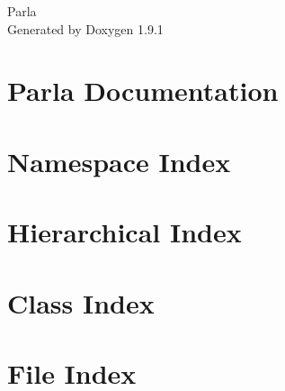 \let\mypdfximage\pdfximage\def\pdfximage{\immediate\mypdfximage}\documentclass[twoside]{book}
\newcommand{\+}{\discretionary{\mbox{\scriptsize$\hookleftarrow$}}{}{}}
\newcommand{\clearemptydoublepage}{%
  \newpage{\pagestyle{empty}\cleardoublepage}%
}
\begin{document}
\raggedbottom

\hypersetup{pageanchor=false,
             bookmarksnumbered=true,
             pdfencoding=unicode
            }
\begin{titlepage}
\vspace*{7cm}
\begin{center}%
{\Large Parla }\\
\vspace*{1cm}
{\large Generated by Doxygen 1.9.1}\\
\end{center}
\end{titlepage}
\clearemptydoublepage
{}
\tableofcontents
\clearemptydoublepage
{}
\hypersetup{pageanchor=true}

\chapter{Parla Documentation}
\label{index}\hypertarget{index}{}
\chapter{Namespace Index}

\chapter{Hierarchical Index}

\chapter{Class Index}

\chapter{File Index}

\end{document}
